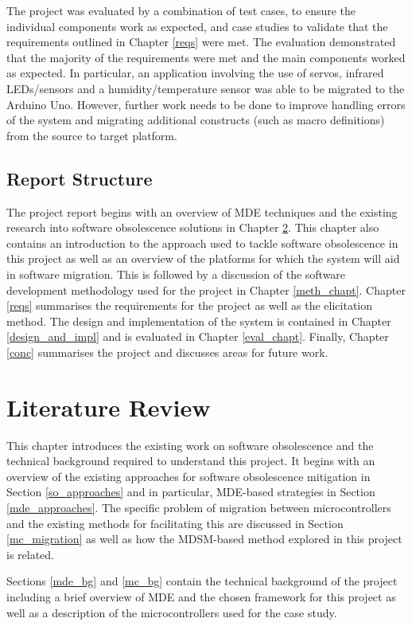 \documentclass{UoYCSproject}
\begin{document}
The project was evaluated by a combination of test cases, to ensure the individual components work as expected, and case studies to validate that the requirements outlined in Chapter \ref{reqs} were met. The evaluation demonstrated that the majority of the requirements were met and the main components worked as expected. In particular, an application involving the use of servos, infrared LEDs/sensors and a humidity/temperature sensor was able to be migrated to the Arduino Uno. However, further work needs to be done to improve handling errors of the system and migrating additional constructs (such as macro definitions) from the source to target platform. 

\section{Report Structure}
The project report begins with an overview of MDE techniques and the existing research into software obsolescence solutions in Chapter \ref{lit_review}. This chapter also contains an introduction to the approach used to tackle software obsolescence in this project as well as an overview of the platforms for which the system will aid in software migration. This is followed by
a discussion of the software development methodology used for the project in Chapter \ref{meth_chapt}. Chapter \ref{reqs} summarises the requirements for the project as well as the elicitation method. The design and implementation of the system is contained in Chapter \ref{design_and_impl} and is evaluated in Chapter \ref{eval_chapt}. Finally, Chapter \ref{conc} summarises the project and discusses areas for future work.

\chapter{Literature Review} \label{lit_review}
This chapter introduces the existing work on software obsolescence and the technical background required to understand this project. It begins with an overview of the existing approaches for software obsolescence mitigation in Section \ref{so_approaches} and in particular, MDE-based strategies in Section \ref{mde_approaches}. The specific problem of migration between microcontrollers and the existing methods for facilitating this are discussed in Section \ref{mc_migration} as well as how the MDSM-based method explored in this project is related. 

Sections \ref{mde_bg} and \ref{mc_bg} contain the technical background of the project including a brief overview of MDE and the chosen framework for this project as well as a description of the microcontrollers used for the case study.
\end{document}
